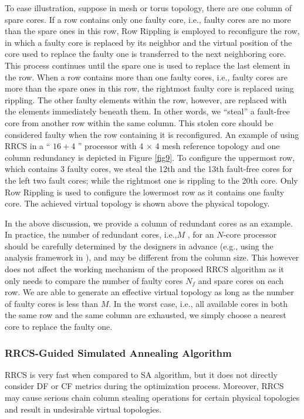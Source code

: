 To ease illustration, suppose in mesh or torus topology, there are one column of spare cores. If a row contains only one faulty core, i.e., faulty cores are no more than the spare ones in this row, Row Rippling is employed to reconfigure the row, in which a faulty core is replaced by its neighbor and the virtual position of the core used to replace the faulty one is transferred to the next neighboring core. This process continues until the spare one is used to replace the last element in the row. When a row contains more than one faulty cores, i.e., faulty cores are more than the spare ones in this row, the rightmost faulty core is replaced using rippling. The other faulty elements within the row, however, are replaced with the elements immediately beneath them. In other words, we “steal” a fault-free core from another row within the same column. This stolen core should be considered faulty when the row containing it is reconfigured. An example of using RRCS in a “ $16+4$ ” processor with 4 $\times$ 4 mesh reference topology and one column redundancy is depicted in Figure \ref{fig9}. To configure the uppermost row, which contains 3 faulty cores, we steal the 12th and the 13th fault-free cores for the left two fault cores; while the rightmost one is rippling to the 20th core. Only Row Rippling is used to configure the lowermost row as it contains one faulty core. The achieved virtual topology is shown above the physical topology.

In the above discussion, we provide a column of redundant cores as an example. In practice, the number of redundant cores, i.e.,$M$ , for an $N$-core processor should be carefully determined by the designers in advance (e.g., using the analysis framework in \cite{pan2007framework}), and may be different from the column size. This however does not affect the working mechanism of the proposed RRCS algorithm as it only needs to compare the number of faulty cores   $N_{f}$  and spare cores on each row. We are able to generate an effective virtual topology as long as the number of faulty cores is less than $M$. In the worst case, i.e., all available cores in both the same row and the same column are exhausted, we simply choose a nearest core to replace the faulty one.

\subsubsection{RRCS-Guided Simulated Annealing Algorithm }
RRCS is very fast when compared to SA algorithm, but it does not directly consider DF or CF metrics during the optimization process. Moreover, RRCS may cause serious chain column stealing operations for certain physical topologies and result in undesirable virtual topologies.

